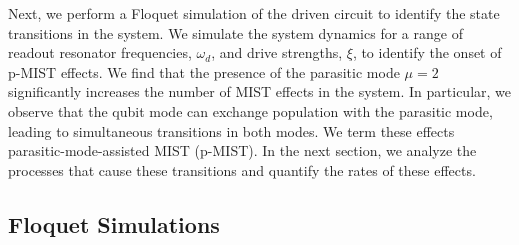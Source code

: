 \documentclass[%
reprint,
superscriptaddress,
 amsmath,amssymb,
 aps,
 prx,
longbibliography,
floatfix,
]{revtex4-2}
\begin{document}
Next, we perform a Floquet simulation of the driven circuit to identify the state transitions in the system. We simulate the system dynamics for a range of readout resonator frequencies, $\omega_d$, and drive strengths, $\xi$, to identify the onset of p-MIST effects. We find that the presence of the parasitic mode $\mu=2$ significantly increases the number of MIST effects in the system. In particular, we observe that the qubit mode can exchange population with the parasitic mode, leading to simultaneous transitions in both modes. We term these effects parasitic-mode-assisted MIST (p-MIST). In the next section, we analyze the processes that cause these transitions and quantify the rates of these effects.

\subsection{Floquet Simulations} 
\end{document}
